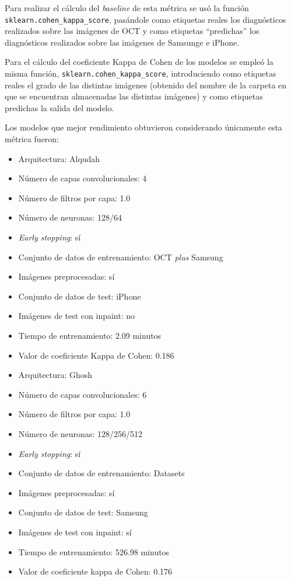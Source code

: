 Para realizar el cálculo del \textit{baseline} de esta métrica se usó la función \texttt{sklearn.cohen\_kappa\_score}, pasándole como etiquetas reales los diagnósticos realizados sobre las imágenes de OCT y como etiquetas ``predichas'' los diagnósticos realizados sobre las imágenes de Samsunge e iPhone.

Para el cálculo del coeficiente Kappa de Cohen de los modelos se empleó la misma función, \texttt{sklearn.cohen\_kappa\_score}, introduciendo como etiquetas reales el grado de las distintas imágenes (obtenido del nombre de la carpeta en que se encuentran almacenadas las distintas imágenes) y como etiquetas predichas la salida del modelo.

Los modelos que mejor rendimiento obtuvieron considerando únicamente esta métrica fueron:

\begin{itemize}
    \item Arquitectura: Alqudah
    \item Número de capas convolucionales: 4
    \item Número de filtros por capa: 1.0
    \item Número de neuronas: 128/64
    \item \textit{Early stopping}: sí
    \item Conjunto de datos de entrenamiento: OCT \textit{plus} Samsung
    \item Imágenes preprocesadas: sí
    \item Conjunto de datos de test: iPhone
    \item Imágenes de test con inpaint: no
    \item Tiempo de entrenamiento: 2.09 minutos
    \item Valor de coeficiente Kappa de Cohen: 0.186
\end{itemize}

\begin{itemize}
    \item Arquitectura: Ghosh
    \item Número de capas convolucionales: 6
    \item Número de filtros por capa: 1.0
    \item Número de neuronas: 128/256/512
    \item \textit{Early stopping}: sí
    \item Conjunto de datos de entrenamiento: Datasets
    \item Imágenes preprocesadas: sí
    \item Conjunto de datos de test: Samsung
    \item Imágenes de test con inpaint: sí
    \item Tiempo de entrenamiento: 526.98 minutos
    \item Valor de coeficiente kappa de Cohen: 0.176
\end{itemize}

